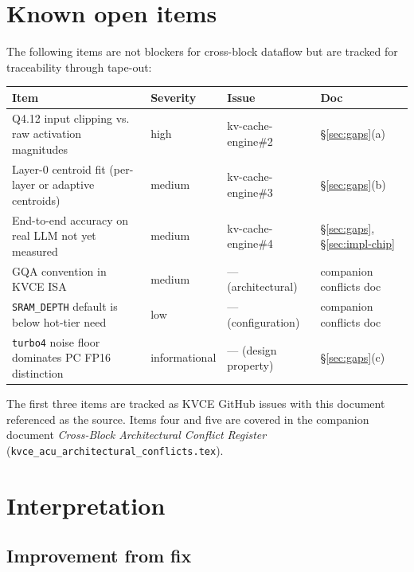 \documentclass[11pt]{article}
\begin{document}
\section{Known open items}
\label{sec:openitems}

The following items are not blockers for cross-block dataflow but
are tracked for traceability through tape-out:

\begin{center}
\renewcommand{\arraystretch}{1.2}
\setlength{\tabcolsep}{5pt}
\begin{tabular}{@{}p{}lll@{}}
\toprule
\textbf{Item} & \textbf{Severity} & \textbf{Issue} & \textbf{Doc} \\
\midrule
Q4.12 input clipping vs. raw activation magnitudes
  & high   & kv-cache-engine\#2 & \S\ref{sec:gaps}(a) \\
Layer-0 centroid fit (per-layer or adaptive centroids)
  & medium & kv-cache-engine\#3 & \S\ref{sec:gaps}(b) \\
End-to-end accuracy on real LLM not yet measured
  & medium & kv-cache-engine\#4 & \S\ref{sec:gaps}, \S\ref{sec:impl-chip} \\
GQA convention in KVCE ISA
  & medium & --- (architectural)  & companion conflicts doc \\
\texttt{SRAM\_DEPTH} default is below hot-tier need
  & low    & --- (configuration)  & companion conflicts doc \\
\texttt{turbo4} noise floor dominates PC FP16 distinction
  & informational & --- (design property) & \S\ref{sec:gaps}(c) \\
\bottomrule
\end{tabular}
\end{center}

The first three items are tracked as KVCE GitHub issues with
this document referenced as the source. Items four and five are
covered in the companion document
\textit{Cross-Block Architectural Conflict Register}
(\texttt{kvce\_acu\_architectural\_conflicts.tex}).

\section{Interpretation}
\label{sec:interpretation}

\subsection*{Improvement from fix}
\end{document}
